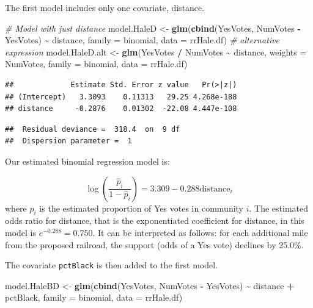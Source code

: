 \documentclass[
]{krantz}
\newenvironment{Shaded}{\begin{snugshade}}{\end{snugshade}}
\newcommand{\AttributeTok}[1]{\textcolor[rgb]{0.27,0.27,0.27}{#1}}
\newcommand{\CommentTok}[1]{\textcolor[rgb]{0.37,0.37,0.37}{\textit{#1}}}
\newcommand{\FunctionTok}[1]{\textcolor[rgb]{0.27,0.27,0.27}{\textbf{#1}}}
\newcommand{\NormalTok}[1]{#1}
\newcommand{\OtherTok}[1]{\textcolor[rgb]{0.37,0.37,0.37}{#1}}
\newcommand{\SpecialCharTok}[1]{\textcolor[rgb]{0.43,0.43,0.43}{\textbf{#1}}}
\begin{document}
The first model includes only one covariate, distance.

\begin{Shaded}
\begin{Highlighting}[]
\CommentTok{\# Model with just distance}
\NormalTok{model.HaleD }\OtherTok{\textless{}{-}} \FunctionTok{glm}\NormalTok{(}\FunctionTok{cbind}\NormalTok{(YesVotes, NumVotes }\SpecialCharTok{{-}}\NormalTok{ YesVotes) }\SpecialCharTok{\textasciitilde{}}
\NormalTok{    distance, }\AttributeTok{family =}\NormalTok{ binomial, }\AttributeTok{data =}\NormalTok{ rrHale.df)}
\CommentTok{\# alternative expression}
\NormalTok{model.HaleD.alt }\OtherTok{\textless{}{-}} \FunctionTok{glm}\NormalTok{(YesVotes }\SpecialCharTok{/}\NormalTok{ NumVotes }\SpecialCharTok{\textasciitilde{}}\NormalTok{ distance, }
    \AttributeTok{weights =}\NormalTok{ NumVotes, }\AttributeTok{family =}\NormalTok{ binomial, }\AttributeTok{data =}\NormalTok{ rrHale.df)}
\end{Highlighting}
\end{Shaded}

\begin{verbatim}
##             Estimate Std. Error z value   Pr(>|z|)
## (Intercept)   3.3093    0.11313   29.25 4.268e-188
## distance     -0.2876    0.01302  -22.08 4.447e-108
\end{verbatim}

\begin{verbatim}
##  Residual deviance =  318.4  on  9 df 
##  Dispersion parameter =  1
\end{verbatim}

Our estimated binomial regression model is:

\[\log\left(\frac{\hat{p}_i}{1-\hat{p}_i}\right)=3.309-0.288 \textrm{distance}_i\]
where \(\hat{p}_i\) is the estimated proportion of Yes votes in community \(i\). The estimated odds ratio for distance, that is the exponentiated coefficient for distance, in this model is \(e^{-0.288}=0.750\). It can be interpreted as follows: for each additional mile from the proposed railroad, the support (odds of a Yes vote) declines by 25.0\%.

The covariate \texttt{pctBlack} is then added to the first model.

\begin{Shaded}
\begin{Highlighting}[]
\NormalTok{model.HaleBD }\OtherTok{\textless{}{-}} \FunctionTok{glm}\NormalTok{(}\FunctionTok{cbind}\NormalTok{(YesVotes, NumVotes }\SpecialCharTok{{-}}\NormalTok{ YesVotes) }\SpecialCharTok{\textasciitilde{}}
\NormalTok{  distance }\SpecialCharTok{+}\NormalTok{ pctBlack, }\AttributeTok{family =}\NormalTok{ binomial, }\AttributeTok{data =}\NormalTok{ rrHale.df)}
\end{Highlighting}
\end{Shaded}
\end{document}
